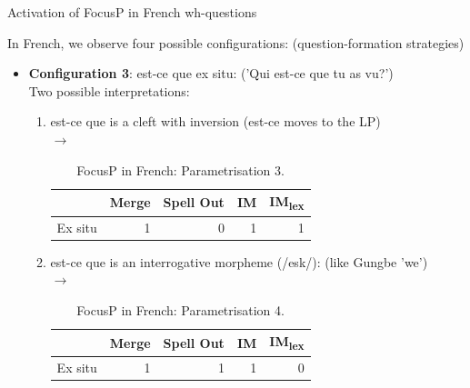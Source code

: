 \documentclass[lesson_slides]{subfiles}
\begin{document}
\begin{frame}[c]{Activation of FocusP in French wh-questions}

    In French, we observe four possible configurations: (question-formation strategies)
    \begin{itemize}
        \item[\ding{227}] \textbf{Configuration 3}: \pause est-ce que ex situ: \pause ('Qui est-ce que tu as vu?')\\ \pause
        Two possible interpretations:\\ \pause
        \begin{enumerate}
            \item est-ce que is a cleft with inversion \pause (est-ce moves to the LP)\\ \pause
        $\longrightarrow$  \pause
    \vspace*{2mm}
    \begin{table}[H]
    \centering
        \begin{tabular}{|l|r|r|r|r|}
        \hline
         & Merge & Spell Out & IM & IM\textsubscript{lex} \\
        \hline
        Ex situ & 1 & 0 & 1 & 1 \\
        \hline
        \end{tabular}
    \caption{\label{tab:samp}FocusP in French: Parametrisation 3.}
    \end{table}

    \item est-ce que is an interrogative morpheme (/esk/):
        \pause (like Gungbe 'we')\\ \pause
        $\longrightarrow$  \pause
    \vspace*{2mm}
    \begin{table}[H]
    \centering
        \begin{tabular}{|l|r|r|r|r|}
        \hline
         & Merge & Spell Out & IM & IM\textsubscript{lex} \\
        \hline
        Ex situ & 1 & 1 & 1 & 0 \\
        \hline
        \end{tabular}
    \caption{\label{tab:samp}FocusP in French: Parametrisation 4.}
    \end{table}
    \end{enumerate}
    \end{itemize}

\end{frame}
\end{document}
